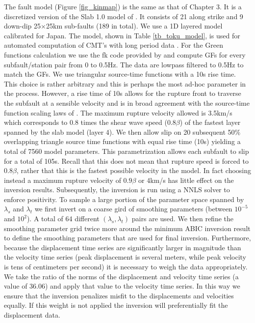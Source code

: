 The fault model (Figure \ref{fig_kinmap}) is the same as that of Chapter 3. It is a discretized version of the Slab 1.0 model of \citep{hayes2012}. It consists of 21 along strike and 9 down-dip 25$\times$25km sub-faults (189 in total). We use a 1D layered model calibrated for Japan. The model, shown in Table \ref{tb_toku_model}, is used for automated computation of CMT's with long period data \citep{fukuyama1998,tsuruoka2009}. For the Green functions calculation we use the fk code provided by \citep{zhu2002} and compute GFs for every subfault/station pair from 0 to 0.5Hz. The data are lowpass filtered to 0.5Hz to match the GFs. We use triangular source-time functions with a 10s rise time. This choice is rather arbitrary and this is perhaps the most ad-hoc parameter in the process. However, a rise time of 10s allows for the rupture front to traverse the subfault at a sensible velocity and is in broad agreement with the source-time function scaling laws of \citep{tanioka1997}. The maximum rupture velocity allowed is 3.5km/s which corresponds to 0.8 times the shear wave speed ($0.8\beta$) of the fastest layer spanned by the slab model (layer 4). We then allow slip on 20 subsequent 50\% overlapping triangle source time functions with equal rise time (10s) yielding a total of 7560 model parameters. This parametrization allows each subfault to slip for a total of 105s. Recall that this does not mean that rupture speed is forced to 0.8$\beta$, rather that this is the fastest possible velocity in the model. In fact choosing instead a maximum rupture velocity of $0.9\beta$ or 4km/s has little effect on the inversion results. Subsequently, the inversion is run using a NNLS solver to enforce positivity. To sample a large portion of the parameter space spanned by $\lambda_s$ and $\lambda_t$ we first invert on a coarse gird of smoothing parameters (between $10^{-5}$ and $10^2$). A total of 64 different $(\lambda_s,\lambda_t)$ pairs are used. We then refine the smoothing parameter grid twice more around the minimum ABIC inversion result to define the smoothing parameters that are used for final inversion. Furthermore, because the displacement time series are significantly larger in magnitude than the velocity time series (peak displacement is several meters, while peak velocity is tens of centimeters per second) it is necessary to weigh the data appropriately. We take the ratio of the norms of the displacement and velocity time series (a value of 36.06) and apply that value to the velocity time series. In this way we ensure that the inversion penalizes misfit to the displacements and velocities equally. If this weight is not applied the inversion will preferentially fit the displacement data.

